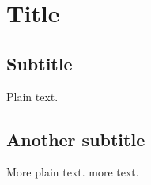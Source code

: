 \newcommand{\titleinfo}{Elektronik 2 - Formelsammlung}
\newcommand{\authorinfo}{Anina Sch\"alle \& DIE Schweisser}
\newcommand{\versioninfo}{$Version: bla$}




 
\section{Title}
\subsection{Subtitle}
Plain text.
\subsection{Another subtitle}
More plain text.
more text.

